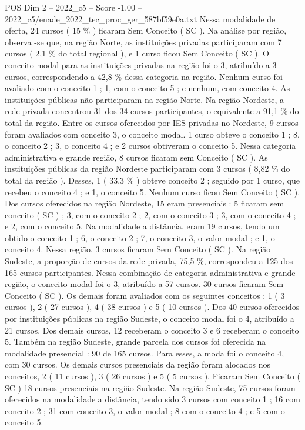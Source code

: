 \begin{textsample}{POS Dim 2 – 2022\_c5 – Score -1.00 – 2022\_c5/enade\_2022\_tec\_proc\_ger\_587bf59e0a.txt}
Nessa modalidade de oferta, 24 cursos ( 15 \% ) ficaram Sem Conceito ( SC ).
Na análise por região, observa -se que, na região Norte, as instituições privadas participaram com 7 cursos ( 2,1 \% do total regional ), e 1 curso ficou Sem Conceito ( SC ).
O conceito modal para as instituições privadas na região foi o 3, atribuído a 3 cursos, correspondendo a 42,8 \% dessa categoria na região.
Nenhum curso foi avaliado com o conceito 1 ; 1, com o conceito 5 ; e nenhum, com conceito 4.
As instituições públicas não participaram na região Norte.
Na região Nordeste, a rede privada concentrou 31 dos 34 cursos participantes, o equivalente a 91,1 \% do total da região.
Entre os cursos oferecidos por IES privadas no Nordeste, 9 cursos foram avaliados com conceito 3, o conceito modal. 1 curso obteve o conceito 1 ; 8, o conceito 2 ; 3, o conceito 4 ; e 2 cursos obtiveram o conceito 5.
Nessa categoria administrativa e grande região, 8 cursos ficaram sem Conceito ( SC ).
As instituições públicas da região Nordeste participaram com 3 cursos ( 8,82 \% do total da região ).
Desses, 1 ( 33,3 \% ) obteve conceito 2 ; seguido por 1 curso, que recebeu o conceito 4 ; e 1, o conceito 5.
Nenhum curso ficou Sem Conceito ( SC ).
Dos cursos oferecidos na região Nordeste, 15 eram presenciais : 5 ficaram sem conceito ( SC ) ; 3, com o conceito 2 ; 2, com o conceito 3 ; 3, com o conceito 4 ; e 2, com o conceito 5.
Na modalidade a distância, eram 19 cursos, tendo um obtido o conceito 1 ; 6, o conceito 2 ; 7, o conceito 3, o valor modal ; e 1, o conceito 4.
Nessa região, 3 cursos ficaram Sem Conceito ( SC ).
Na região Sudeste, a proporção de cursos da rede privada, 75,5 \%, correspondeu a 125 dos 165 cursos participantes.
Nessa combinação de categoria administrativa e grande região, o conceito modal foi o 3, atribuído a 57 cursos. 30 cursos ficaram Sem Conceito ( SC ).
Os demais foram avaliados com os seguintes conceitos : 1 ( 3 cursos ), 2 ( 27 cursos ), 4 ( 38 cursos ) e 5 ( 10 cursos ).
Dos 40 cursos oferecidos por instituições públicas na região Sudeste, o conceito modal foi o 4, atribuído a 21 cursos.
Dos demais cursos, 12 receberam o conceito 3 e 6 receberam o conceito 5.
Também na região Sudeste, grande parcela dos cursos foi oferecida na modalidade presencial : 90 de 165 cursos.
Para esses, a moda foi o conceito 4, com 30 cursos.
Os demais cursos presenciais da região foram alocados nos conceitos, 2 ( 11 cursos ), 3 ( 26 cursos ) e 5 ( 5 cursos ).
Ficaram Sem Conceito ( SC ) 18 cursos presenciais na região Sudeste.
Na região Sudeste, 75 cursos foram oferecidos na modalidade a distância, tendo sido 3 cursos com conceito 1 ; 16 com conceito 2 ; 31 com conceito 3, o valor modal ; 8 com o conceito 4 ; e 5 com o conceito 5.

\end{textsample}
